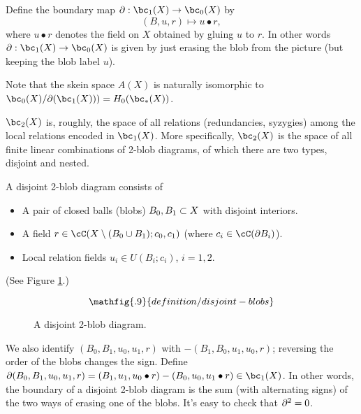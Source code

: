 Define the boundary map $\bd : \bc_1(X) \to \bc_0(X)$ by 
\[ 
	(B, u, r) \mapsto u\bullet r, 
\]
where $u\bullet r$ denotes the field on $X$ obtained by gluing $u$ to $r$.
In other words $\bd : \bc_1(X) \to \bc_0(X)$ is given by
just erasing the blob from the picture
(but keeping the blob label $u$).

Note that the skein space $A(X)$
is naturally isomorphic to $\bc_0(X)/\bd(\bc_1(X))) = H_0(\bc_*(X))$.

$\bc_2(X)$ is, roughly, the space of all relations (redundancies, syzygies) among the 
local relations encoded in $\bc_1(X)$.
More specifically, $\bc_2(X)$ is the space of all finite linear combinations of
2-blob diagrams, of which there are two types, disjoint and nested.

A disjoint 2-blob diagram consists of
\begin{itemize}
\item A pair of closed balls (blobs) $B_0, B_1 \subset X$ with disjoint interiors.
\item A field $r \in \cC(X \setmin (B_0 \cup B_1); c_0, c_1)$
(where $c_i \in \cC(\bd B_i)$).
\item Local relation fields $u_i \in U(B_i; c_i)$, $i=1,2$. 
\end{itemize}
(See Figure \ref{blob2ddiagram}.)
\begin{figure}[t]\begin{equation*}
\mathfig{.9}{definition/disjoint-blobs}
\end{equation*}\caption{A disjoint 2-blob diagram.}\label{blob2ddiagram}\end{figure}
We also identify $(B_0, B_1, u_0, u_1, r)$ with $-(B_1, B_0, u_1, u_0, r)$;
reversing the order of the blobs changes the sign.
Define $\bd(B_0, B_1, u_0, u_1, r) = 
(B_1, u_1, u_0\bullet r) - (B_0, u_0, u_1\bullet r) \in \bc_1(X)$.
In other words, the boundary of a disjoint 2-blob diagram
is the sum (with alternating signs)
of the two ways of erasing one of the blobs.
It's easy to check that $\partial^2 = 0$.

